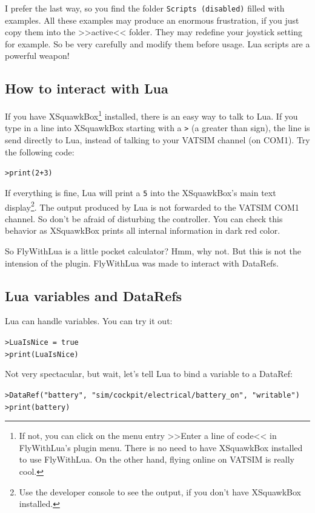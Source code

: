 \documentclass[11pt,parskip=half,a4paper]{scrartcl}
\begin{document}
I prefer the last way, so you find the folder \verb|Scripts (disabled)| filled with examples. All these examples may produce an enormous frustration, if you just copy them into the >>active<< folder. They may redefine your joystick setting for example. So be very carefully and modify them before usage. Lua scripts are a powerful weapon!

\newpage
\subsection{How to interact with Lua}

If you have XSquawkBox\footnote{If not, you can click on the menu entry >>Enter a line of code<< in FlyWithLua's plugin menu. There is no need to have XSquawkBox installed to use FlyWithLua. On the other hand, flying online on VATSIM is really cool.} installed, there is an easy way to talk to Lua. If you type in a line into XSquawkBox starting with a \verb|>| (a greater than sign), the line is send directly to Lua, instead of talking to your VATSIM channel (on COM1). Try the following code:

\verb|>print(2+3)|

If everything is fine, Lua will print a \verb|5| into the XSquawkBox's main text display\footnote{Use the developer console to see the output, if you don't have XSquawkBox installed.}. The output produced by Lua is not forwarded to the VATSIM COM1 channel. So don't be afraid of disturbing the controller. You can check this behavior as XSquawkBox prints all internal information in dark red color.

So FlyWithLua is a little pocket calculator? Hmm, why not. But this is not the intension of the plugin. FlyWithLua was made to interact with DataRefs.

\subsection{Lua variables and DataRefs}

Lua can handle variables. You can try it out:

\verb|>LuaIsNice = true|\\
\verb|>print(LuaIsNice)|

Not very spectacular, but wait, let's tell Lua to bind a variable to a DataRef:

\verb|>DataRef("battery", "sim/cockpit/electrical/battery_on", "writable")|\\
\verb|>print(battery)|
\end{document}
